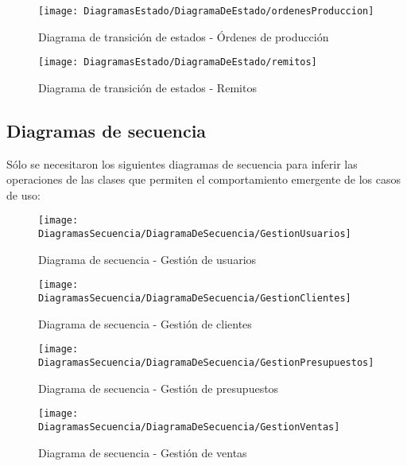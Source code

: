 	\begin{figure}[H]
		\centering
		\texttt{[image: DiagramasEstado/DiagramaDeEstado/ordenesProduccion]}
		\caption{Diagrama de transición de estados - Órdenes de producción}
		\label{fig:Diagrama de transición de estados - Órdenes de producción}
	\end{figure}
	\begin{figure}[H]
		\centering
		\texttt{[image: DiagramasEstado/DiagramaDeEstado/remitos]}
		\caption{Diagrama de transición de estados - Remitos}
		\label{fig:Diagrama de transición de estados - Remitos}
	\end{figure}

	\clearpage %
	\subsection{Diagramas de secuencia}
	Sólo se necesitaron los siguientes diagramas de secuencia para inferir las operaciones de las clases que permiten el comportamiento emergente de los casos de uso:

	\begin{figure}[H]
		\centering
		\texttt{[image: DiagramasSecuencia/DiagramaDeSecuencia/GestionUsuarios]}
		\caption{Diagrama de secuencia - Gestión de usuarios}
		\label{fig:Diagrama de secuencia - Gestión de usuarios}
	\end{figure}

	\begin{figure}[H]
		\centering
		\texttt{[image: DiagramasSecuencia/DiagramaDeSecuencia/GestionClientes]}
		\caption{Diagrama de secuencia - Gestión de clientes}
		\label{fig:Diagrama de secuencia - Gestión de clientes}
	\end{figure}

	\begin{figure}[H]
		\centering
		\texttt{[image: DiagramasSecuencia/DiagramaDeSecuencia/GestionPresupuestos]}
		\caption{Diagrama de secuencia - Gestión de presupuestos}
		\label{fig:Diagrama de secuencia - Gestión de presupuestos}
	\end{figure}

	\begin{figure}[H]
		\centering
		\texttt{[image: DiagramasSecuencia/DiagramaDeSecuencia/GestionVentas]}
		\caption{Diagrama de secuencia - Gestión de ventas}
		\label{fig:Diagrama de secuencia - Gestión de ventas}
	\end{figure}

	\clearpage %
	
	
		
	
    